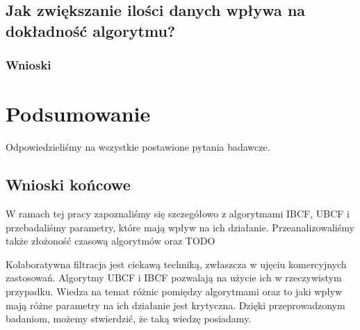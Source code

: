 \documentclass[12pt, a4paper]{article}
\begin{document}
\subsection{Jak zwiększanie ilości danych wpływa na dokładność algorytmu?}

\subsubsection{Wnioski}

\section{Podsumowanie}
Odpowiedzieliśmy na wszystkie postawione pytania badawcze. 

\subsection{Wnioski końcowe}
W ramach tej pracy zapoznaliśmy się szczegółowo z algorytmami IBCF, UBCF i przebadaliśmy parametry, które mają wpływ na ich działanie. Przeanalizowaliśmy także złożoność czasową algorytmów oraz TODO

Kolaboratywna filtracja jest ciekawą techniką, zwłaszcza w ujęciu komercyjnych zastosowań. Algorytmy UBCF i IBCF pozwalają na użycie ich w rzeczywistym przypadku. Wiedza na temat różnic pomiędzy algorytmami oraz to jaki wpływ mają różne parametry na ich działanie jest krytyczna. Dzięki przeprowadzonym badaniom, możemy stwierdzić, że taką wiedzę posiadamy.



\nocite{*}


\end{document}
